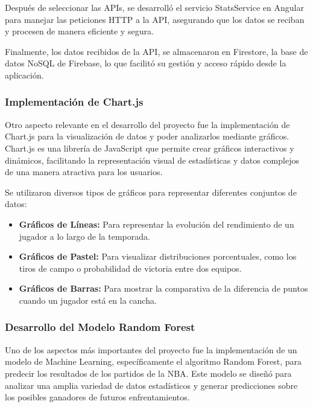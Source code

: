 
Después de seleccionar las APIs, se desarrolló el servicio StatsService en Angular para manejar las peticiones HTTP a la API, asegurando que los datos se reciban y procesen de manera eficiente y segura.

Finalmente, los datos recibidos de la API, se almacenaron en Firestore, la base de datos NoSQL de Firebase, lo que facilitó su gestión y acceso rápido desde la aplicación.

\subsubsection{Implementación de Chart.js}
Otro aspecto relevante en el desarrollo del proyecto fue la implementación de Chart.js para la visualización de datos y poder analizarlos mediante gráficos. Chart.js es una librería de JavaScript que permite crear gráficos interactivos y dinámicos, facilitando la representación visual de estadísticas y datos complejos de una manera atractiva para los usuarios.

Se utilizaron diversos tipos de gráficos para representar diferentes conjuntos de datos:
\begin{itemize}
\tightlist
    \item 
        \textbf{Gráficos de Líneas:} Para representar la evolución del rendimiento de un jugador a lo largo de la temporada.
    \item 
        \textbf{Gráficos de Pastel:} Para visualizar distribuciones porcentuales, como los tiros de campo o probabilidad de victoria entre dos equipos.
    \item 
        \textbf{Gráficos de Barras:} Para mostrar la comparativa de la diferencia de puntos cuando un jugador está en la cancha.
\end{itemize}


\subsubsection{Desarrollo del Modelo Random Forest}
Uno de los aspectos más importantes del proyecto fue la implementación de un modelo de Machine Learning, específicamente el algoritmo Random Forest, para predecir los resultados de los partidos de la NBA. Este modelo se diseñó para analizar una amplia variedad de datos estadísticos y generar predicciones sobre los posibles ganadores de futuros enfrentamientos.

